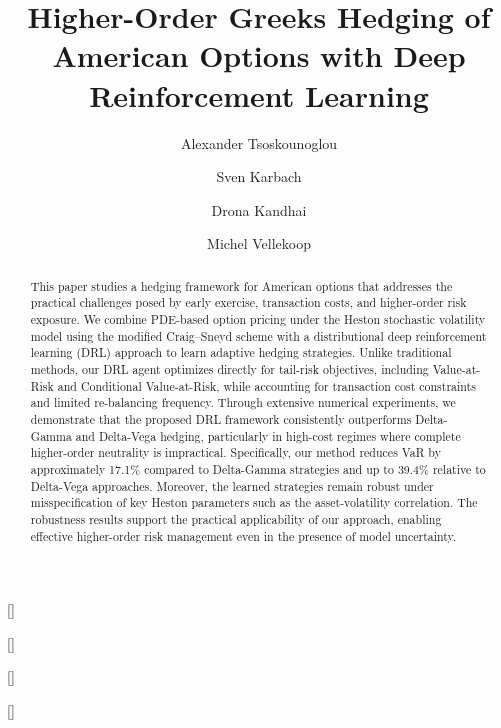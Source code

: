\documentclass[a4paper,fleqn]{cas-dc}
\begin{document}

\title[mode=title]{Higher-Order Greeks Hedging of American Options \newline with Deep Reinforcement Learning}

\author[1]{Alexander Tsoskounoglou}[]

\author[1,2]{Sven Karbach}[]
\fnmark[1]

\author[1,2]{Drona Kandhai}[]
\fnmark[1]

\author[3]{Michel Vellekoop}[]







\begin{abstract}
This paper studies a hedging framework for American options that addresses the practical challenges posed by early exercise, transaction costs, and higher-order risk exposure. We combine PDE-based option pricing under the Heston stochastic volatility model using the modified Craig–Sneyd scheme with a distributional deep reinforcement learning (DRL) approach to learn adaptive hedging strategies. Unlike traditional methods, our DRL agent optimizes directly for tail-risk objectives, including Value-at-Risk and Conditional Value-at-Risk, while accounting for transaction cost constraints and limited re-balancing frequency. Through extensive numerical experiments, we demonstrate that the proposed DRL framework consistently outperforms Delta-Gamma and Delta-Vega hedging, particularly in high-cost regimes where complete higher-order neutrality is impractical. Specifically, our method reduces VaR by approximately 17.1\% compared to Delta-Gamma strategies and up to 39.4\% relative to Delta-Vega approaches. Moreover, the learned strategies remain robust under misspecification of key Heston parameters such as the asset-volatility correlation. The robustness results support the practical applicability of our approach, enabling effective higher-order risk management even in the presence of model uncertainty.
\end{abstract}
\end{document}
